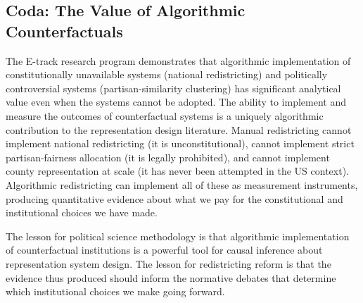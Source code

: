 \subsection{Coda: The Value of Algorithmic Counterfactuals}

The E-track research program demonstrates that algorithmic implementation of
constitutionally unavailable systems (national redistricting) and politically
controversial systems (partisan-similarity clustering) has significant
analytical value even when the systems cannot be adopted.  The ability to
implement and measure the outcomes of counterfactual systems is a uniquely
algorithmic contribution to the representation design literature.  Manual
redistricting cannot implement national redistricting (it is unconstitutional),
cannot implement strict partisan-fairness allocation (it is legally prohibited),
and cannot implement county representation at scale (it has never been attempted
in the US context).  Algorithmic redistricting can implement all of these as
measurement instruments, producing quantitative evidence about what we pay for
the constitutional and institutional choices we have made.

The lesson for political science methodology is that algorithmic implementation
of counterfactual institutions is a powerful tool for causal inference about
representation system design.  The lesson for redistricting reform is that the
evidence thus produced should inform the normative debates that determine which
institutional choices we make going forward.
